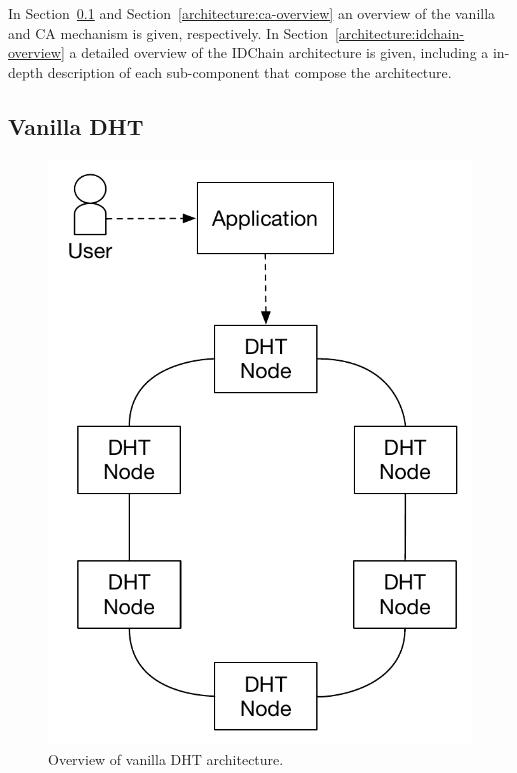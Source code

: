 In Section~\ref{architecture:vanilla-overview} and Section~\ref{architecture:ca-overview} an overview of the vanilla and \ac{CA} mechanism is given, respectively.
In Section~\ref{architecture:idchain-overview} a detailed overview of the IDChain architecture is given, including a in-depth description of each sub-component that compose the architecture.

\subsection{Vanilla DHT}\label{architecture:vanilla-overview}

\begin{figure}
  \includegraphics[width=\linewidth]{Figures/architecture-overview-none.pdf}
  \caption{Overview of vanilla DHT architecture.}
\label{fig:architecture-vanilla-overview}
\end{figure}


